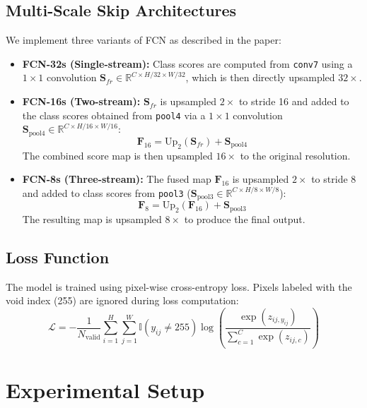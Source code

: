 \documentclass[conference]{IEEEtran}
\begin{document}
\subsection{Multi-Scale Skip Architectures}
We implement three variants of FCN as described in the paper:
\begin{itemize}
    \item \textbf{FCN-32s (Single-stream):} Class scores are computed from \texttt{conv7} using a $1 \times 1$ convolution $\mathbf{S}_{fr} \in \mathbb{R}^{C \times H/32 \times W/32}$, which is then directly upsampled $32\times$.
    \item \textbf{FCN-16s (Two-stream):} $\mathbf{S}_{fr}$ is upsampled $2\times$ to stride 16 and added to the class scores obtained from \texttt{pool4} via a $1 \times 1$ convolution $\mathbf{S}_{\text{pool4}} \in \mathbb{R}^{C \times H/16 \times W/16}$:
    \begin{equation}
    \mathbf{F}_{16} = \text{Up}_2(\mathbf{S}_{fr}) + \mathbf{S}_{\text{pool4}}
    \end{equation}
    The combined score map is then upsampled $16\times$ to the original resolution.
    \item \textbf{FCN-8s (Three-stream):} The fused map $\mathbf{F}_{16}$ is upsampled $2\times$ to stride 8 and added to class scores from \texttt{pool3} ($\mathbf{S}_{\text{pool3}} \in \mathbb{R}^{C \times H/8 \times W/8}$):
    \begin{equation}
    \mathbf{F}_{8} = \text{Up}_2(\mathbf{F}_{16}) + \mathbf{S}_{\text{pool3}}
    \end{equation}
    The resulting map is upsampled $8\times$ to produce the final output.
\end{itemize}

\subsection{Loss Function}
The model is trained using pixel-wise cross-entropy loss. Pixels labeled with the void index (255) are ignored during loss computation:
\begin{equation}
\mathcal{L} = -\frac{1}{N_{\text{valid}}} \sum_{i=1}^{H} \sum_{j=1}^{W} \mathbb{I}(y_{ij} \neq 255) \log \left( \frac{\exp(z_{ij, y_{ij}})}{\sum_{c=1}^{C} \exp(z_{ij, c})} \right)
\end{equation}

\section{Experimental Setup}
\end{document}
